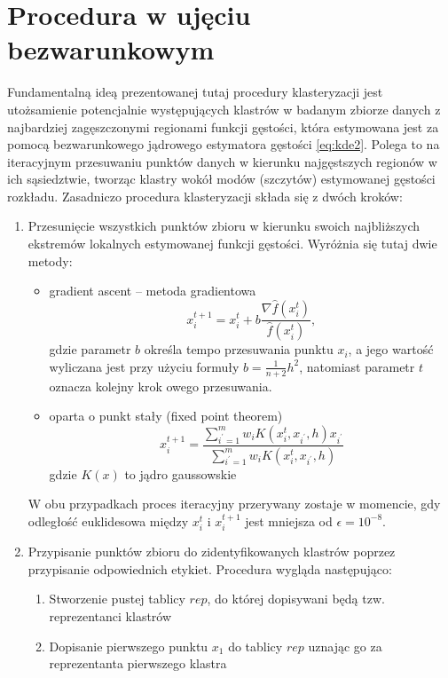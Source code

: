 \documentclass[12pt,a4paper,oneside]{book}
\theoremstyle{definition}
\begin{document}
\section{Procedura w ujęciu bezwarunkowym}

Fundamentalną ideą prezentowanej tutaj procedury klasteryzacji jest utożsamienie potencjalnie występujących klastrów w badanym zbiorze danych z najbardziej zagęszczonymi regionami funkcji gęstości, która estymowana jest za pomocą bezwarunkowego jądrowego estymatora gęstości \eqref{eq:kde2}. Polega to na iteracyjnym przesuwaniu punktów danych w kierunku najgęstszych regionów w ich sąsiedztwie, tworząc klastry wokół modów (szczytów) estymowanej gęstości rozkładu. Zasadniczo procedura klasteryzacji składa się z dwóch kroków:
\begin{enumerate}
\item Przesunięcie wszystkich punktów zbioru w kierunku swoich najbliższych ekstremów lokalnych estymowanej funkcji gęstości. Wyróżnia się tutaj dwie metody:
\begin{itemize}
\item gradient ascent -- metoda gradientowa
\begin{equation}
x_i^{t+1} = x_i^t + b \frac{\nabla \hat{f}(x_i^t)}{\hat{f}(x_i^t)},
\end{equation}
gdzie parametr $b$ określa tempo przesuwania punktu $x_i$, a jego wartość wyliczana jest przy użyciu formuły $b = \frac{1}{n+2} h^2$, natomiast parametr $t$ oznacza kolejny krok owego przesuwania.
\item oparta o punkt stały (fixed point theorem)
\begin{equation}
x_i^{t+1} = \frac{\sum_{i^{'}=1}^m w_i K(x_i^t,x_{i^{'}},h) x_{i^{'}}}{\sum_{i^{'}=1}^m w_i K(x_i^t,x_{i^{'}},h)}
\end{equation}
gdzie $K(x)$ to jądro gaussowskie
\end{itemize}
W obu przypadkach proces iteracyjny przerywany zostaje w momencie, gdy odległość euklidesowa między $x_i^t$ i $x_i^{t+1}$ jest mniejsza od $\epsilon = 10^{-8}$.
\item Przypisanie punktów zbioru do zidentyfikowanych klastrów poprzez przypisanie odpowiednich etykiet. Procedura wygląda następująco:
\begin{enumerate}
\item Stworzenie pustej tablicy $rep$, do której dopisywani będą tzw. reprezentanci klastrów
\item Dopisanie pierwszego punktu $x_1$ do tablicy $rep$ uznając go za reprezentanta pierwszego klastra

\end{enumerate}
\end{enumerate}
\end{document}
